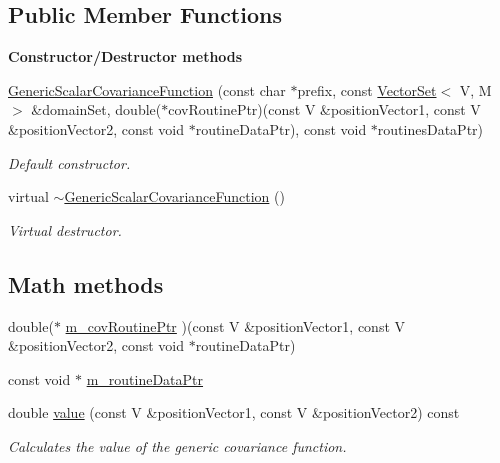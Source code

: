 \subsection*{Public Member Functions}
\begin{Indent}{\bf Constructor/\-Destructor methods}\par
\begin{DoxyCompactItemize}
\item 
\hyperlink{class_q_u_e_s_o_1_1_generic_scalar_covariance_function_a33edf41b7bcff2d5b519d9a0a6fee314}{Generic\-Scalar\-Covariance\-Function} (const char $\ast$prefix, const \hyperlink{class_q_u_e_s_o_1_1_vector_set}{Vector\-Set}$<$ V, M $>$ \&domain\-Set, double($\ast$cov\-Routine\-Ptr)(const V \&position\-Vector1, const V \&position\-Vector2, const void $\ast$routine\-Data\-Ptr), const void $\ast$routines\-Data\-Ptr)
\begin{DoxyCompactList}\small\item\em Default constructor. \end{DoxyCompactList}\item 
virtual \hyperlink{class_q_u_e_s_o_1_1_generic_scalar_covariance_function_a8138a46b55498cf9b2f14aa51776d437}{$\sim$\-Generic\-Scalar\-Covariance\-Function} ()
\begin{DoxyCompactList}\small\item\em Virtual destructor. \end{DoxyCompactList}\end{DoxyCompactItemize}
\end{Indent}
\subsection*{Math methods}
\begin{DoxyCompactItemize}
\item 
double($\ast$ \hyperlink{class_q_u_e_s_o_1_1_generic_scalar_covariance_function_a5ab019180d841614bc6c6c957be91f93}{m\-\_\-cov\-Routine\-Ptr} )(const V \&position\-Vector1, const V \&position\-Vector2, const void $\ast$routine\-Data\-Ptr)
\item 
const void $\ast$ \hyperlink{class_q_u_e_s_o_1_1_generic_scalar_covariance_function_ac09d3c5de0ca3e00e2ee16f7654c8da6}{m\-\_\-routine\-Data\-Ptr}
\item 
double \hyperlink{class_q_u_e_s_o_1_1_generic_scalar_covariance_function_ab02d90f973034672b84888c941230a8c}{value} (const V \&position\-Vector1, const V \&position\-Vector2) const 
\begin{DoxyCompactList}\small\item\em Calculates the value of the generic covariance function. \end{DoxyCompactList}\end{DoxyCompactItemize}
